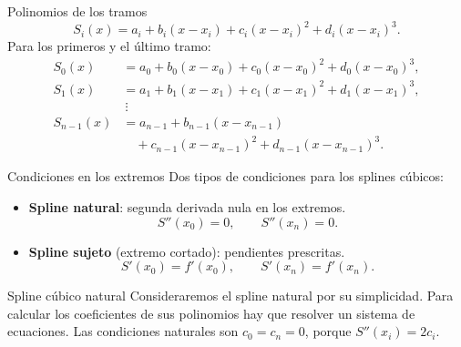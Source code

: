 \documentclass[main.tex]{subfiles}
\begin{document}
\begin{frame}[t]{Polinomios de los tramos}
\small
\[S_i(x)=a_i+b_i(x-x_i)+c_i(x-x_i)^2+d_i(x-x_i)^3.\]
Para los primeros y el último tramo:
\begin{align*}
S_0(x)&=a_0+b_0(x-x_0)+c_0(x-x_0)^2+d_0(x-x_0)^3,\\
S_1(x)&=a_1+b_1(x-x_1)+c_1(x-x_1)^2+d_1(x-x_1)^3,\\
&\ \vdots\\
S_{n-1}(x)&=a_{n-1}+b_{n-1}(x-x_{n-1})\\
&\quad+c_{n-1}(x-x_{n-1})^2+d_{n-1}(x-x_{n-1})^3.
\end{align*}
\end{frame}
\begin{frame}[t]{Condiciones en los extremos}
Dos tipos de condiciones para los splines cúbicos:
\begin{itemize}
\item \textbf{Spline natural}: segunda derivada nula en los extremos.
\[S''(x_0)=0,\qquad S''(x_n)=0.\]
\item \textbf{Spline sujeto} (extremo cortado): pendientes prescritas.
\[S'(x_0)=f'(x_0),\qquad S'(x_n)=f'(x_n).\]
\end{itemize}
\end{frame}
\begin{frame}[t]{Spline cúbico natural}
Consideraremos el spline natural por su simplicidad.
\bigskip
Para calcular los coeficientes de sus polinomios hay que resolver un sistema de ecuaciones.
\bigskip
Las condiciones naturales son $c_0=c_n=0$, porque $S''(x_i)=2c_i$.
\end{frame}
\end{document}
